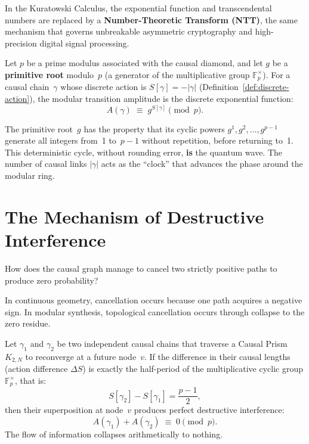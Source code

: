 In the Kuratowski Calculus, the exponential function and transcendental
numbers are replaced by a \textbf{Number-Theoretic Transform (NTT)}, the
same mechanism that governs unbreakable asymmetric cryptography and
high-precision digital signal processing.

\begin{definition}
\label{def:modular-amplitude}
Let $p$ be a prime modulus associated with the causal diamond, and let
$g$ be a \textbf{primitive root} modulo~$p$ (a generator of the
multiplicative group $\mathbb{F}_p^\times$). For a causal chain~$\gamma$
whose discrete action is $S[\gamma] = -|\gamma|$
(Definition~\ref{def:discrete-action}), the modular transition amplitude
is the discrete exponential function:
\begin{equation}
  \boxed{\;
  A(\gamma) \;\equiv\; g^{S[\gamma]} \pmod p.
  \;}
  \label{eq:modular-amplitude}
\end{equation}
\end{definition}

\noindent
The primitive root~$g$ has the property that its cyclic powers
$g^1, g^2, \ldots, g^{p-1}$ generate all integers from~1 to~$p-1$
without repetition, before returning to~1. This deterministic cycle,
without rounding error, \textbf{is} the quantum wave. The number of
causal links $|\gamma|$ acts as the ``clock'' that advances the phase
around the modular ring.

\section{The Mechanism of Destructive Interference}
\label{sec:destructive-interference}

How does the causal graph manage to cancel two strictly positive paths to
produce zero probability?

In continuous geometry, cancellation occurs because one path acquires a
negative sign. In modular synthesis, topological cancellation occurs
through collapse to the zero residue.

\begin{theorem}
\label{thm:quantum-interference}
Let $\gamma_1$ and $\gamma_2$ be two independent causal chains that
traverse a Causal Prism~$K_{2,N}$ to reconverge at a future node~$v$.
If the difference in their causal lengths (action difference $\Delta S$)
is exactly the half-period of the multiplicative cyclic group
$\mathbb{F}_p^\times$, that is:
\[
  S[\gamma_2] - S[\gamma_1] = \frac{p-1}{2},
\]
then their superposition at node~$v$ produces perfect destructive
interference:
\begin{equation}
  A(\gamma_1) + A(\gamma_2) \;\equiv\; 0 \pmod p.
  \label{eq:destructive-interference}
\end{equation}
The flow of information collapses arithmetically to nothing.
\end{theorem}

